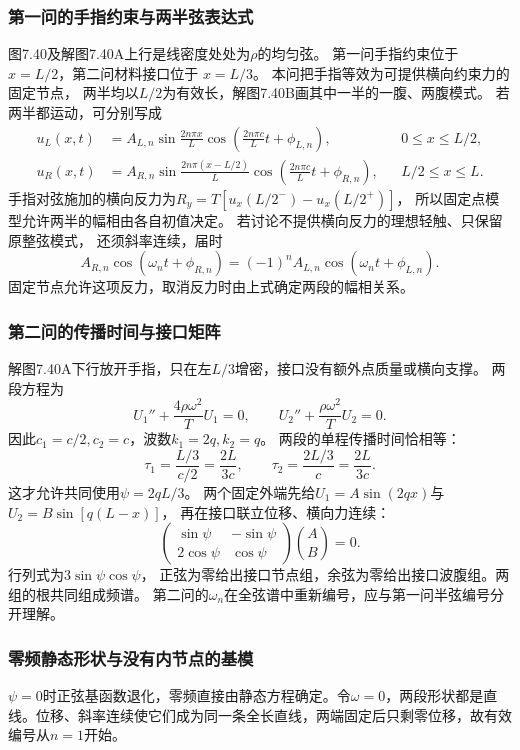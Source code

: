 \documentclass[UTF8,fontset=fandol,a4paper,11pt]{ctexart}
\begin{document}
\subsubsection*{第一问的手指约束与两半弦表达式}
图7.40及解图7.40A上行是线密度处处为$\rho$的均匀弦。
第一问手指约束位于 $x=L/2$，第二问材料接口位于 $x=L/3$。
本问把手指等效为可提供横向约束力的固定节点，
两半均以$L/2$为有效长，解图7.40B画其中一半的一腹、两腹模式。
若两半都运动，可分别写成
\[
\begin{aligned}
u_L(x,t)&=A_{L,n}\sin\frac{2n\pi x}{L}
\cos\left(\frac{2n\pi c}{L}t+\phi_{L,n}\right),
&&0\le x\le L/2,\\
u_R(x,t)&=A_{R,n}\sin\frac{2n\pi(x-L/2)}{L}
\cos\left(\frac{2n\pi c}{L}t+\phi_{R,n}\right),
&&L/2\le x\le L.
\end{aligned}
\]
手指对弦施加的横向反力为$R_y=T[u_x(L/2^-)-u_x(L/2^+)]$，
所以固定点模型允许两半的幅相由各自初值决定。
若讨论不提供横向反力的理想轻触、只保留原整弦模式，
还须斜率连续，届时
\[
A_{R,n}\cos(\omega_nt+\phi_{R,n})
=(-1)^nA_{L,n}\cos(\omega_nt+\phi_{L,n}).
\]
固定节点允许这项反力，取消反力时由上式确定两段的幅相关系。

\subsubsection*{第二问的传播时间与接口矩阵}
解图7.40A下行放开手指，只在左$L/3$增密，接口没有额外点质量或横向支撑。
两段方程为
\[
U_1''+\frac{4\rho\omega^2}{T}U_1=0,\qquad
U_2''+\frac{\rho\omega^2}{T}U_2=0.
\]
因此$c_1=c/2,c_2=c$，波数$k_1=2q,k_2=q$。
两段的单程传播时间恰相等：
\[
\tau_1=\frac{L/3}{c/2}=\frac{2L}{3c},\qquad
\tau_2=\frac{2L/3}{c}=\frac{2L}{3c}.
\]
这才允许共同使用$\psi=2qL/3$。
两个固定外端先给$U_1=A\sin(2qx)$与$U_2=B\sin[q(L-x)]$，
再在接口联立位移、横向力连续：
\[
\begin{pmatrix}\sin\psi&-\sin\psi\\2\cos\psi&\cos\psi\end{pmatrix}
\binom AB=0.
\]
行列式为$3\sin\psi\cos\psi$，
正弦为零给出接口节点组，余弦为零给出接口波腹组。两组的根共同组成频谱。
第二问的$\omega_n$在全弦谱中重新编号，应与第一问半弦编号分开理解。

\subsubsection*{零频静态形状与没有内节点的基模}
$\psi=0$时正弦基函数退化，零频直接由静态方程确定。令$\omega=0$，两段形状都是直线。位移、斜率连续使它们成为同一条全长直线，两端固定后只剩零位移，故有效编号从$n=1$开始。
\end{document}
